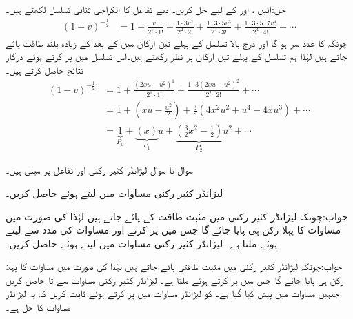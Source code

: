 حل:آئیں ،  اور  کے لیے حل کریں۔ دیے تفاعل کا الکراجی ثنائی تسلسل لکھتے ہیں۔
\begin{align*}
(1-v)^{-\frac{1}{2}}&=1+\frac{v^1}{2^1\cdot 1!}+\frac{1\cdot 3 v^2}{2^2\cdot 2!}+\frac{1\cdot 3 \cdot 5 v^3}{2^3\cdot 3!}+\frac{1\cdot 3 \cdot 5\cdot 7 v^4}{2^4\cdot 4!}+\cdots
\end{align*}
چونکہ  کا عدد سر  ہو گا اور درج بالا تسلسل کے پہلے تین ارکان میں کے بعد  کے زیادہ بلند طاقت پائے جاتے ہیں لہٰذا ہم تسلسل کے پہلے تین ارکان پر نظر رکھتے ہیں۔اس تسلسل میں  پر کرتے ہوئے درکار نتائج حاصل کرتے ہیں۔
\begin{align*}
(1-v)^{-\frac{1}{2}}&=1+\frac{(2xu-u^2)^1}{2^1\cdot 1!}+\frac{1\cdot 3 (2xu-u^2)^2}{2^2\cdot 2!}+\cdots\\
&=1+(xu-\frac{u^2}{2})+\frac{3}{8}(4x^2u^2+u^4-4xu^3)+\cdots\\
&=\underbrace{1}_{P_0}+\underbrace{\left(x\right)}_{P_1}u+\underbrace{\left(\frac{3}{2}x^2-\frac{1}{2}\right)}_{P_2}u^2+\cdots
\end{align*}

سوال  تا سوال  لیژانڈر کثیر رکنی اور تفاعل پر مبنی ہیں۔

لیژانڈر کثیر رکنی مساوات  میں  لیتے ہوئے  حاصل کریں۔

جواب:چونکہ لیژانڈر کثیر رکنی میں مثبت طاقت کے  پائے جاتے ہیں لہٰذا  کی صورت میں مساوات  کا پہلا رکن
  ہی پایا جائے گا جس میں  پر کرتے اور مساوات  کی مدد سے   لیتے ہوئے  ملتا ہے۔
لیژانڈر کثیر رکنی مساوات  میں  لیتے ہوئے  حاصل کریں۔

جواب:چونکہ لیژانڈر کثیر رکنی میں مثبت طاقتی  پائے جاتے ہیں لہٰذا  کی صورت میں مساوات  کا پہلا رکن
  ہی پایا جائے گا جس میں  پر کرتے ہوئے  ملتا ہے۔
لیژانڈر کثیر رکنی مساوات  سے  تا  حاصل کریں جنہیں مساوات  میں پیش کیا گیا ہے۔
  کو لیژانڈر مساوات  میں پر کرتے ہوئے ثابت کریں کہ یہ لیژانڈر مساوات کا حل ہے۔

